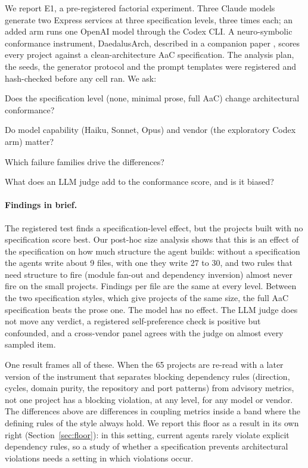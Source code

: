\documentclass[10pt,a4paper]{article}
\newcommand{\tool}{DaedalusArch}
\begin{document}
We report E1, a pre-registered factorial experiment. Three Claude models generate two Express services at three
specification levels, three times each; an added arm runs one OpenAI model through the Codex CLI. A neuro-symbolic
conformance instrument, \tool{}, described in a companion paper \cite{daedalus2026tool}, scores every project
against a clean-architecture AaC specification. The analysis plan, the seeds, the generator protocol and the
prompt templates were registered and hash-checked before any cell ran. We ask:

\begin{description}[leftmargin=1.2cm,style=sameline]
  \item[RQ1] Does the specification level (none, minimal prose, full AaC) change architectural conformance?
  \item[RQ2] Do model capability (Haiku, Sonnet, Opus) and vendor (the exploratory Codex arm) matter?
  \item[RQ3] Which failure families drive the differences?
  \item[RQ4] What does an LLM judge add to the conformance score, and is it biased?
\end{description}

\paragraph{Findings in brief.} The registered test finds a specification-level effect, but the projects built with
no specification score best. Our post-hoc size analysis shows that this is an effect of the specification on how
much structure the agent builds: without a specification the agents write about 9 files, with one they write 27 to
30, and two rules that need structure to fire (module fan-out and dependency inversion) almost never fire on the
small projects. Findings per file are the same at every level. Between the two specification styles, which give
projects of the same size, the full AaC specification beats the prose one. The model has no effect. The LLM judge
does not move any verdict, a registered self-preference check is positive but confounded, and a cross-vendor panel
agrees with the judge on almost every sampled item.

One result frames all of these. When the 65 projects are re-read with a later version of the instrument that
separates blocking dependency rules (direction, cycles, domain purity, the repository and port patterns) from
advisory metrics, not one project has a blocking violation, at any level, for any model or vendor. The differences
above are differences in coupling metrics inside a band where the defining rules of the style always hold. We report
this floor as a result in its own right (Section~\ref{sec:floor}): in this setting, current agents rarely violate
explicit dependency rules, so a study of whether a specification prevents architectural violations needs a setting
in which violations occur. %
\end{document}
